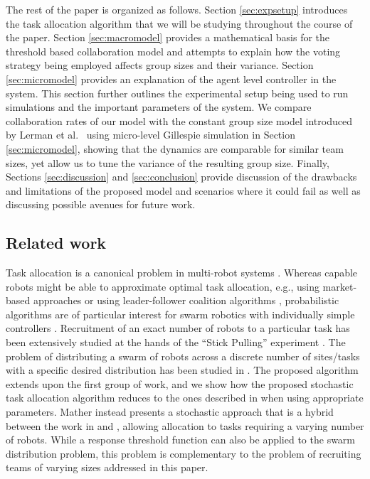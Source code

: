 \documentclass{TeXstyles/DARS/svmult}  %
\begin{document}
The rest of the paper is organized as follows. Section \ref{sec:expsetup} introduces the task allocation algorithm that we will be studying throughout the course of the paper.
Section \ref{sec:macromodel} provides a mathematical basis for the threshold based collaboration model and attempts to explain how the voting strategy being employed affects group sizes and their variance.
Section \ref{sec:micromodel} provides an explanation of the agent level controller in the system. This section further outlines the experimental setup being used to run simulations and the important parameters of the system. 
We compare collaboration rates of our model with the constant group size model introduced by Lerman et al.~\cite{Lerman2001} using micro-level Gillespie simulation in Section \ref{sec:micromodel}, showing that the dynamics are comparable for similar team sizes, yet allow us to tune the variance of the resulting group size.  
Finally, Sections \ref{sec:discussion} and \ref{sec:conclusion} provide discussion of the drawbacks and limitations of the proposed model and scenarios where it could fail as well as discussing possible avenues for future work.

\subsection{Related work}
Task allocation is a canonical problem in multi-robot systems \cite{Gerkey2004}. Whereas capable robots might be able to approximate optimal task allocation, e.g., using market-based approaches \cite{amstutz2008distributed,vig2007coalition} or using  leader-follower coalition algorithms \cite{Chen2011}, probabilistic algorithms are of particular interest for swarm robotics with individually simple controllers \cite{dantu2012comparison}. Recruitment of an exact number of robots to a particular task has been extensively studied at the hands of the ``Stick Pulling'' experiment \cite{Lerman2001,Martinoli2004}. The problem of distributing a swarm of robots across a discrete number of sites/tasks with a specific desired distribution has been studied in \cite{Berman2009,Correll2008}. The proposed algorithm extends upon the first group of work, and we show how the proposed stochastic task allocation algorithm reduces to the ones described in \cite{Lerman2001,Martinoli2004} when using appropriate parameters.  Mather \cite{mather2010towards} instead presents a stochastic approach that is a hybrid between the work in \cite{Berman2009} and \cite{Martinoli2004}, allowing allocation to tasks requiring a varying number of robots.
While a response threshold function can also be applied to the swarm distribution problem, this problem is complementary to the problem of recruiting teams of varying sizes addressed in this paper. 
\end{document}
